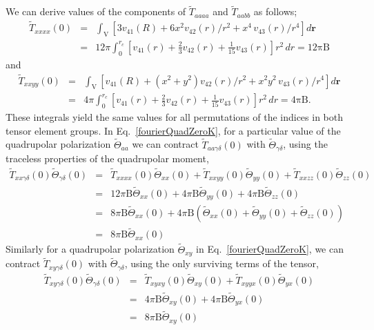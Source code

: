 We can derive values of the components of $\tilde{T}_{aaaa}$ and
$\tilde{T}_{aabb}$ as follows;
\begin{eqnarray}
\tilde{T}_{xxxx}(0) &=&
\int_{\textrm{V}} 
\left[ 3v_{41}(R)+6x^2v_{42}(r)/r^2 + x^4\,v_{43}(r)/r^4 \right] d\mathbf{r} \nonumber \\ 
&=&12\pi \int_0^{r_c} 
\left[ v_{41}(r)+\frac{2}{3} v_{42}(r) + \frac{1}{15}v_{43}(r) \right] r^2\,dr =
\mathrm{12 \pi B}
\end{eqnarray}
and 
\begin{eqnarray}
  \tilde{T}_{xxyy}(0)&=&
                         \int_{\textrm{V}} 
                         \left[ v_{41}(R)+(x^2+y^2) v_{42}(r)/r^2 + x^2 y^2\,v_{43}(r)/r^4 \right] d\mathbf{r} \nonumber \\
                     &=&4\pi \int_0^{r_c}
                         \left[ v_{41}(r)+\frac{2}{3} v_{42}(r) + \frac{1}{15}v_{43}(r) \right] r^2\,dr =
                         \mathrm{4 \pi B}.
\end{eqnarray}
These integrals yield the same values for all permutations of the
indices in both tensor element groups.  In Eq.~\ref{fourierQuadZeroK}, for a particular value of the quadrupolar
polarization $\tilde{\Theta}_{aa}$ we can contract
$\tilde{T}_{aa\gamma\delta}(0)$ with $\tilde{\Theta}_{\gamma\delta}$,
using the traceless properties of the quadrupolar moment,
\begin{eqnarray}
\tilde{T}_{xx\gamma\delta}(0)\tilde{\Theta}_{\gamma\delta}(0) &=& \tilde{T}_{xxxx}(0)\tilde{\Theta}_{xx}(0) + \tilde{T}_{xxyy}(0)\tilde{\Theta}_{yy}(0) + \tilde{T}_{xxzz}(0)\tilde{\Theta}_{zz}(0) \nonumber \\
&=& 12 \pi \mathrm{B}\tilde{\Theta}_{xx}(0) +
    4 \pi \mathrm{B}\tilde{\Theta}_{yy}(0) +
    4 \pi \mathrm{B}\tilde{\Theta}_{zz}(0) \nonumber \\
&=& 8 \pi \mathrm{B}\tilde{\Theta}_{xx}(0) + 4 \pi
    \mathrm{B}\left(\tilde{\Theta}_{xx}(0)+\tilde{\Theta}_{yy}(0) +
    \tilde{\Theta}_{zz}(0)\right) \nonumber \\
&=& 8 \pi \mathrm{B}\tilde{\Theta}_{xx}(0)
\end{eqnarray} 
Similarly for a quadrupolar polarization $\tilde{\Theta}_{xy}$ in
Eq.~\ref{fourierQuadZeroK}, we can contract
$\tilde{T}_{xy\gamma\delta}(0)$ with $\tilde{\Theta}_{\gamma\delta}$,
using the only surviving terms of the tensor, 
\begin{eqnarray}
\tilde{T}_{xy\gamma\delta}(0)\tilde{\Theta}_{\gamma\delta}(0) &=& \tilde{T}_{xyxy}(0)\tilde{\Theta}_{xy}(0) + \tilde{T}_{xyyx}(0)\tilde{\Theta}_{yx}(0) \nonumber \\
&=& 4 \pi \mathrm{B}\tilde{\Theta}_{xy}(0) +
    4 \pi \mathrm{B}\tilde{\Theta}_{yx}(0) \nonumber \\
&=& 8 \pi \mathrm{B}\tilde{\Theta}_{xy}(0)
\end{eqnarray}
